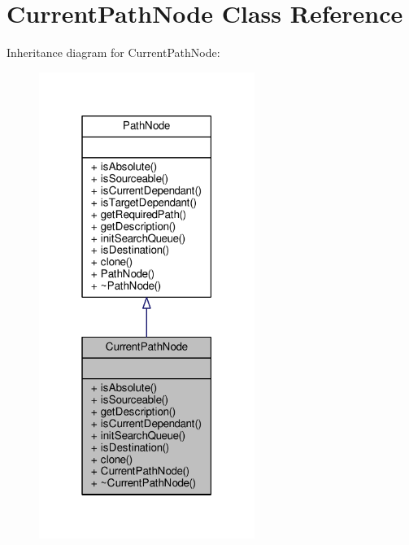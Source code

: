\hypertarget{classCurrentPathNode}{}\section{Current\+Path\+Node Class Reference}
\label{classCurrentPathNode}


Inheritance diagram for Current\+Path\+Node\+:
\nopagebreak
\begin{figure}[H]
\begin{center}
\leavevmode
\includegraphics[width=199pt]{dc/d20/classCurrentPathNode__inherit__graph}
\end{center}
\end{figure}


